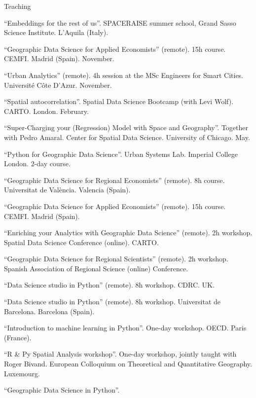 \documentclass[12pt,2up]{article}
\begin{document}
\begin{cv}{}
\begin{cvlist}{Teaching}
\item[\textbf{Workshops and Short Courses}]
\item[2026] ``Embeddings for the rest of us''.
        SPACERAISE summer school, Grand Sasso Science Institute.
        L'Aquila (Italy).
\item[2023] ``Geographic Data Science for Applied Economists'' (remote).
        15h course. CEMFI. Madrid (Spain). November.
\item[] ``Urban Analytics'' (remote). 4h session at the MSc Engineers for Smart
        Cities. Universit\'{e} C\^ote D'Azur. November.
\item[] ``Spatial autocorrelation''. Spatial Data Science Bootcamp (with
        Levi Wolf). CARTO. London. February.
\item[2022] ``Super-Charging your (Regression) Model with Space and
        Geography''. Together with Pedro Amaral. Center for Spatial Data
        Science. University of Chicago. May.
\item[2021] ``Python for Geographic Data Science''. Urban Systems Lab. Imperial
    College London. 2-day course.
    \item[] ``Geographic Data Science for Regional Economists'' (remote).
        8h course. Universitat de Val\`{e}ncia. Valencia (Spain).
    \item[] ``Geographic Data Science for Applied Economists'' (remote).
        15h course. CEMFI. Madrid (Spain).
    \item[2020] ``Enriching your Analytics with Geographic Data Science'' (remote). 2h
        workshop. Spatial Data Science Conference (online). CARTO.
    \item[] ``Geographic Data Science for Regional Scientists'' (remote). 2h
            workshop. Spanish Association of Regional Science (online) Conference.
    \item[] ``Data Science studio in Python'' (remote). 8h
        workshop. CDRC. UK.
    \item[] ``Data Science studio in Python'' (remote). 8h
        workshop. Universitat de Barcelona. Barcelona (Spain).
    \item[2019] ``Introduction to machine learning in Python''. One-day
        workshop. OECD. Paris (France).
    \item[] ``R \& Py Spatial Analysis workshop''. One-day workshop,
        jointly taught with Roger Bivand. European Colloquium on Theoretical
        and Quantitative Geography. Luxemourg.
    \item[2018] ``Geographic Data Science in Python''.

\end{cvlist}
\end{cv}
\end{document}
